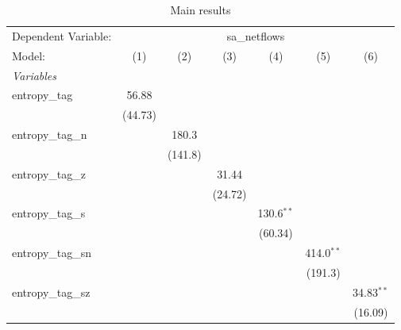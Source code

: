 
\begin{table}[htbp]
   \centering
   \footnotesize
   \begin{threeparttable}[b]
      \caption{\label{tab:reg_sa_netflows_tag.tex} Main results}
      \begin{tabular}{lcccccc}
         \tabularnewline \midrule \midrule
         Dependent Variable: & \multicolumn{6}{c}{sa\_netflows}\\
         Model:              & (1)            & (2)            & (3)            & (4)            & (5)            & (6)\\  
         \midrule
         \emph{Variables}\\
         entropy\_tag        & 56.88          &                &                &                &                &   \\   
                             & (44.73)        &                &                &                &                &   \\   
         entropy\_tag\_n     &                & 180.3          &                &                &                &   \\   
                             &                & (141.8)        &                &                &                &   \\   
         entropy\_tag\_z     &                &                & 31.44          &                &                &   \\   
                             &                &                & (24.72)        &                &                &   \\   
         entropy\_tag\_s     &                &                &                & 130.6$^{**}$   &                &   \\   
                             &                &                &                & (60.34)        &                &   \\   
         entropy\_tag\_sn    &                &                &                &                & 414.0$^{**}$   &   \\   
                             &                &                &                &                & (191.3)        &   \\   
         entropy\_tag\_sz    &                &                &                &                &                & 34.83$^{**}$\\   
                             &                &                &                &                &                & (16.09)\\   

\end{tabular}
\end{threeparttable}
\end{table}
